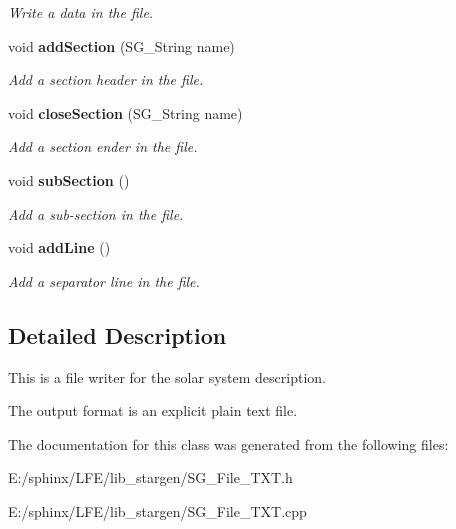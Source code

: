 \begin{CompactItemize}
\begin{CompactList}\small\item\em Write a data in the file. \item\end{CompactList}\item 
void {\bf add\-Section} (SG\_\-String name)\label{class_s_g___file___t_x_t_b6}

\begin{CompactList}\small\item\em Add a section header in the file. \item\end{CompactList}\item 
void {\bf close\-Section} (SG\_\-String name)\label{class_s_g___file___t_x_t_b7}

\begin{CompactList}\small\item\em Add a section ender in the file. \item\end{CompactList}\item 
void {\bf sub\-Section} ()\label{class_s_g___file___t_x_t_b8}

\begin{CompactList}\small\item\em Add a sub-section in the file. \item\end{CompactList}\item 
void {\bf add\-Line} ()\label{class_s_g___file___t_x_t_b9}

\begin{CompactList}\small\item\em Add a separator line in the file. \item\end{CompactList}\end{CompactItemize}


\subsection{Detailed Description}
This is a file writer for the solar system description. 

The output format is an explicit plain text file. 



The documentation for this class was generated from the following files:\begin{CompactItemize}
\item 
E:/sphinx/LFE/lib\_\-stargen/SG\_\-File\_\-TXT.h\item 
E:/sphinx/LFE/lib\_\-stargen/SG\_\-File\_\-TXT.cpp\end{CompactItemize}
